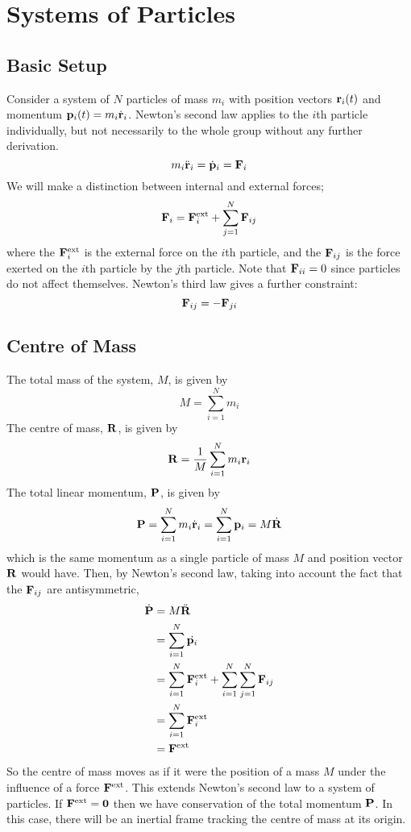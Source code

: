 \documentclass{article}
\begin{document}
\section{Systems of Particles}
\subsection{Basic Setup}
Consider a system of $N$ particles of mass $m_i$ with position vectors $\vb r_i(t)$ and momentum $\vb p_i(t) = m_i \dot {\vb r}_i$. Newton's second law applies to the $i$th particle individually, but not necessarily to the whole group without any further derivation.
\[ m_i \ddot{\vb r}_i = \dot{\vb p}_i = \vb F_i \]
We will make a distinction between internal and external forces;
\[ \vb F_i = \vb F_i^\text{ext} + \sum_{j = 1}^N \vb F_{ij} \]
where the $\vb F_i^\text{ext}$ is the external force on the $i$th particle, and the $\vb F_{ij}$ is the force exerted on the $i$th particle by the $j$th particle. Note that $\vb F_{ii} = 0$ since particles do not affect themselves. Newton's third law gives a further constraint:
\[ \vb F_{ij} = -\vb F_{ji} \]

\subsection{Centre of Mass}
The total mass of the system, $M$, is given by
\[ M = \sum_{i=1}^N m_i \]
The centre of mass, $\vb R$, is given by
\[ \vb R = \frac{1}{M} \sum_{i=1}^N m_i \vb r_i \]
The total linear momentum, $\vb P$, is given by
\[ \vb P = \sum_{i=1}^N m_i \dot{\vb r}_i = \sum_{i=1}^N \vb p_i = M\dot{\vb R} \]
which is the same momentum as a single particle of mass $M$ and position vector $\vb R$ would have. Then, by Newton's second law, taking into account the fact that the $\vb F_{ij}$ are antisymmetric,
\begin{align*}
    \dot{\vb P} & = M \ddot{\vb R}                                                         \\
                & = \sum_{i=1}^N \dot{\vb p_i}                                             \\
                & = \sum_{i=1}^N \vb F_i^\text{ext} + \sum_{i=1}^N \sum_{j=1}^N \vb F_{ij} \\
                & = \sum_{i=1}^N \vb F_i^\text{ext}                                        \\
                & = \vb F^\text{ext}
\end{align*}
So the centre of mass moves as if it were the position of a mass $M$ under the influence of a force $\vb F^\text{ext}$. This extends Newton's second law to a system of particles. If $\vb F^\text{ext} = \vb 0$ then we have conservation of the total momentum $\vb P$. In this case, there will be an inertial frame tracking the centre of mass at its origin.
\end{document}
